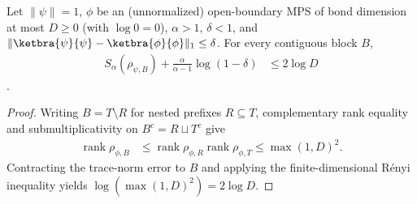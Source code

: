 \begin{lemma}
    \label{thm:chain_block_renyi_approximation_lower_bound}
    \leanok
    Let $\|\psi\|=1$, $\phi$ be an (unnormalized) open-boundary MPS of bond
    dimension at most $D\ge0$ (with $\log0=0$), $\alpha>1$, $\delta<1$, and
    $\lVert\ketbra{\psi}{\psi}-\ketbra{\phi}{\phi}\rVert_1\le\delta$. For every
    contiguous block $B$,
    \begin{align}
        \label{eq:chain_block_renyi_approximation_lower_bound}
        S_\alpha(\rho_{\psi,B})
        +\frac{\alpha}{\alpha-1}\log(1-\delta) & \le2\log D
    \end{align}
    \cite{Schuch2008EntropyScaling,gap:swvc08_interior_block_bond_rank}.
\end{lemma}
\begin{proof}\leanok
    Writing $B=T\setminus R$ for nested prefixes $R\subseteq T$, complementary
    rank equality and submultiplicativity on $B^c=R\sqcup T^c$ give
    \begin{align}
        \label{eq:chain_block_rank_product}
        \operatorname{rank}\rho_{\phi,B}
         & \le\operatorname{rank}\rho_{\phi,R}
        \operatorname{rank}\rho_{\phi,T}\le\max(1,D)^2.
    \end{align}
    Contracting the trace-norm error to $B$ and applying the finite-dimensional
    Rényi inequality yields $\log(\max(1,D)^2)=2\log D$.
\end{proof}

